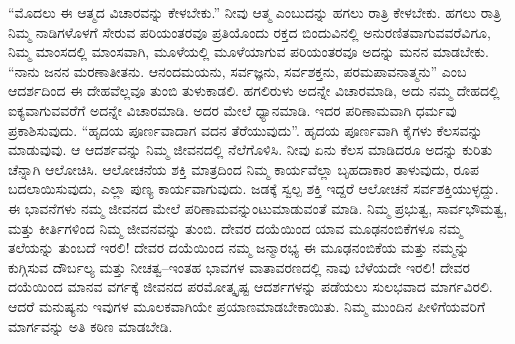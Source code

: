 “ಮೊದಲು ಈ ಆತ್ಮದ ವಿಚಾರವನ್ನು ಕೇಳಬೇಕು.” ನೀವು ಆತ್ಮ ಎಂಬುದನ್ನು ಹಗಲು ರಾತ್ರಿ ಕೇಳಬೇಕು. ಹಗಲು ರಾತ್ರಿ ನಿಮ್ಮ ನಾಡಿಗಳೊಳಗೆ ಸೇರುವ ಪರಿಯಂತರವೂ ಪ್ರತಿಯೊಂದು ರಕ್ತದ ಬಿಂದುವಿನಲ್ಲಿ ಅನುರಣಿತವಾಗುವವರೆವಿಗೂ, ನಿಮ್ಮ ಮಾಂಸದಲ್ಲಿ ಮಾಂಸವಾಗಿ, ಮೂಳೆಯಲ್ಲಿ ಮೂಳೆಯಾಗುವ ಪರಿಯಂತರವೂ ಅದನ್ನು ಮನನ ಮಾಡಬೇಕು. “ನಾನು ಜನನ ಮರಣಾತೀತನು. ಆನಂದಮಯನು, ಸರ್ವಜ್ಞನು, ಸರ್ವಶಕ್ತನು, ಪರಮಪಾವನಾತ್ಮನು” ಎಂಬ ಆದರ್ಶದಿಂದ ಈ ದೇಹವೆಲ್ಲವೂ ತುಂಬಿ ತುಳುಕಾಡಲಿ. ಹಗಲಿರುಳು ಅದನ್ನೇ ವಿಚಾರಮಾಡಿ, ಅದು ನಮ್ಮ ದೇಹದಲ್ಲಿ ಐಕ್ಯವಾಗುವವರೆಗೆ ಅದನ್ನೇ ವಿಚಾರಮಾಡಿ. ಅದರ ಮೇಲೆ ಧ್ಯಾನಮಾಡಿ. ಇದರ ಪರಿಣಾಮವಾಗಿ ಧರ್ಮವು ಪ್ರಕಾಶಿಸುವುದು. “ಹೃದಯ ಪೂರ್ಣವಾದಾಗ ವದನ ತೆರೆಯುವುದು”. ಹೃದಯ ಪೂರ್ಣವಾಗಿ ಕೈಗಳು ಕೆಲಸವನ್ನು ಮಾಡುವುವು. ಆ ಆದರ್ಶವನ್ನು ನಿಮ್ಮ ಜೀವನದಲ್ಲಿ ನೆಲೆಗೊಳಿಸಿ. ನೀವು ಏನು ಕೆಲಸ ಮಾಡಿದರೂ ಅದನ್ನು ಕುರಿತು ಚೆನ್ನಾಗಿ ಆಲೋಚಿಸಿ. ಆಲೋಚನೆಯ ಶಕ್ತಿ ಮಾತ್ರದಿಂದ ನಿಮ್ಮ ಕಾರ್ಯವೆಲ್ಲಾ ಬೃಹದಾಕಾರ ತಾಳುವುದು, ರೂಪ ಬದಲಾಯಿಸುವುದು, ಎಲ್ಲಾ ಪುಣ್ಯ ಕಾರ್ಯವಾಗುವುದು. ಜಡಕ್ಕೆ ಸ್ವಲ್ಪ ಶಕ್ತಿ ಇದ್ದರೆ ಆಲೋಚನೆ ಸರ್ವಶಕ್ತಿಯುಳ್ಳದ್ದು. ಈ ಭಾವನೆಗಳು ನಮ್ಮ ಜೀವನದ ಮೇಲೆ ಪರಿಣಾಮವನ್ನುಂಟುಮಾಡುವಂತೆ ಮಾಡಿ. ನಿಮ್ಮ ಪ್ರಭುತ್ವ, ಸಾರ್ವಭೌಮತ್ವ, ಮತ್ತು ಕೀರ್ತಿಗಳಿಂದ ನಿಮ್ಮ ಜೀವನವನ್ನು ತುಂಬಿ. ದೇವರ ದಯೆಯಿಂದ ಯಾವ ಮೂಢನಂಬಿಕೆಗಳೂ ನಮ್ಮ ತಲೆಯನ್ನು ತುಂಬದೆ ಇರಲಿ! ದೇವರ ದಯೆಯಿಂದ ನಮ್ಮ ಜನ್ಮಾರಭ್ಯ ಈ ಮೂಢನಂಬಿಕೆಯ ಮತ್ತು ನಮ್ಮನ್ನು ಕುಗ್ಗಿಸುವ ದೌರ್ಬಲ್ಯ ಮತ್ತು ನೀಚತ್ವ–ಇಂತಹ ಭಾವಗಳ ವಾತಾವರಣದಲ್ಲಿ ನಾವು ಬೆಳೆಯದೇ ಇರಲಿ! ದೇವರ ದಯೆಯಿಂದ ಮಾನವ ವರ್ಗಕ್ಕೆ ಜೀವನದ ಪರಮೋತ್ಕೃಷ್ಟ ಆದರ್ಶಗಳನ್ನು ಪಡೆಯಲು ಸುಲಭವಾದ ಮಾರ್ಗವಿರಲಿ. ಆದರೆ ಮನುಷ್ಯನು ಇವುಗಳ ಮೂಲಕವಾಗಿಯೇ ಪ್ರಯಾಣಮಾಡಬೇಕಾಯಿತು. ನಿಮ್ಮ ಮುಂದಿನ ಪೀಳಿಗೆಯವರಿಗೆ ಮಾರ್ಗವನ್ನು ಅತಿ ಕಠಿಣ ಮಾಡಬೇಡಿ.

